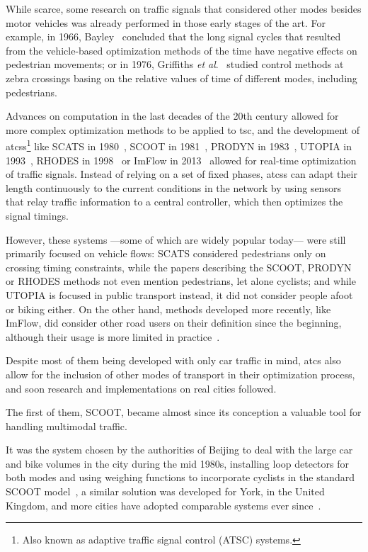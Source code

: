 While scarce, some research on traffic signals that considered other modes besides motor vehicles was already performed in those early stages of the art. 
For example, in 1966, Bayley~\cite{Bayley1966} concluded that the long signal cycles that resulted from the vehicle-based optimization methods of the time have negative effects on pedestrian movements; or in 1976, Griffiths \textit{et al}.~\cite{Griffiths1976} studied control methods at zebra crossings basing on the relative values of time of different modes, including pedestrians.

Advances on computation in the last decades of the 20th century allowed for more complex optimization methods to be applied to \gls{tsc}, and the development of \glspl{atcs}\footnote{Also known as adaptive traffic signal control (ATSC) systems.} like SCATS in 1980~\cite{Sims1980}, SCOOT in 1981~\cite{Robertson1991}, PRODYN in 1983~\cite{Henry1983}, UTOPIA in 1993~\cite{Mauro1990}, RHODES in 1998~\cite{Mirchandani2001} or ImFlow in 2013~\cite{Imflow} allowed for real-time optimization of traffic signals. Instead of relying on a set of fixed phases, \glspl{atcs} can adapt their length continuously to the current conditions in the network by using sensors that relay traffic information to a central controller, which then optimizes the signal timings.

However, these systems —some of which are widely popular today— were still primarily focused on vehicle flows: SCATS considered pedestrians only on crossing timing constraints, while the papers describing the SCOOT, PRODYN or RHODES methods not even mention pedestrians, let alone cyclists; and while UTOPIA is focused in public transport instead, it did not consider people afoot or biking either. On the other hand, methods developed more recently, like ImFlow, did consider other road users on their definition since the beginning, although their usage is more limited in practice~\cite{Wahlstedt2013}.

\medskip

\noindent Despite most of them being developed with only car traffic in mind, \gls{atcs} also allow for the inclusion of other modes of transport in their optimization process, and soon research and implementations on real cities followed. 

The first of them, SCOOT, became almost since its conception a valuable tool for handling multimodal traffic.

It was the system chosen by the authorities of Beijing to deal with the large car and bike volumes in the city during the mid 1980s, installing loop detectors for both modes and using weighing functions to incorporate cyclists in the standard SCOOT model~\cite{Wood1988}, a similar solution was developed for York, in the United Kingdom, and more cities have adopted comparable systems ever since~\cite{Clark2002}.

